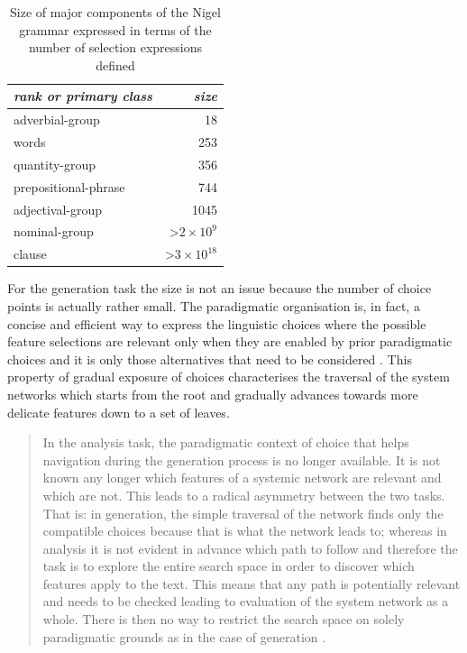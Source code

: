    \begin{table}[!ht]
        \centering
        \begin{tabular}{|l|r|}
            \hline
            \textit{rank or primary class} & \textit{size}                             \\ \hline
            adverbial-group                & 18                                        \\ \hline
            words                          & 253                                       \\ \hline
            quantity-group                 & 356                                       \\ \hline
            prepositional-phrase           & 744                                       \\ \hline
            adjectival-group               & 1045                                      \\ \hline
            nominal-group                  & \textgreater $ 2\times 10^{9} $  \\ \hline
            clause                         & \textgreater $ 3\times 10^{18} $ \\ \hline
        \end{tabular}
        \caption{Size of major components of the Nigel grammar expressed in terms of the number of selection expressions defined \citep[35]{Bateman2008}}
        \label{tab:size}
    \end{table}
    
    For the generation task the size is not an issue because the number of choice points is actually rather small. The paradigmatic organisation is, in fact, a concise and efficient way to express the linguistic choices where the possible feature selections are relevant only when they are enabled by prior paradigmatic choices and it is only those alternatives that need to be considered \citep[12--13]{Halliday96-grammatics}. This property of gradual exposure of choices characterises the traversal of the system networks which starts from the root and gradually advances towards more delicate features down to a set of leaves.
    
    \begin{quote}
        In the analysis task, the paradigmatic context of choice that helps navigation during the generation process is no longer available. It is not known any longer which features of a systemic network are relevant and which are not. This leads to a radical asymmetry between the two tasks. That is: in generation, the simple traversal of the network finds only the compatible choices because that is what the network leads to; whereas in analysis it is not evident in advance which path to follow and therefore the task is to explore the entire search space in order to discover which features apply to the text. This means that any path is potentially relevant and needs to be checked leading to evaluation of the system network as a whole. There is then no way to restrict the search space on solely paradigmatic grounds as in the case of generation \citep[29]{Bateman2008}.
    \end{quote}
    
